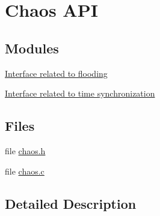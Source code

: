 \hypertarget{group__chaos__interface}{\section{Chaos A\-P\-I}
\label{group__chaos__interface}
}
\subsection*{Modules}
\begin{DoxyCompactItemize}
\item 
\hyperlink{group__chaos__main}{Interface related to flooding}
\item 
\hyperlink{group__chaos__sync}{Interface related to time synchronization}
\end{DoxyCompactItemize}
\subsection*{Files}
\begin{DoxyCompactItemize}
\item 
file \hyperlink{chaos_8h}{chaos.\-h}
\item 
file \hyperlink{chaos_8c}{chaos.\-c}
\end{DoxyCompactItemize}


\subsection{Detailed Description}
